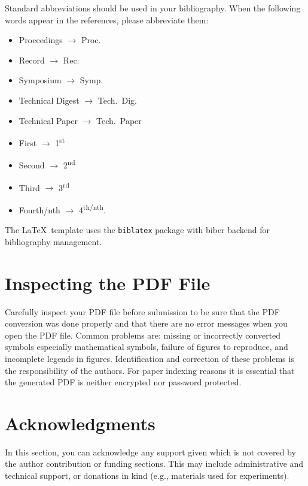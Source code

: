 \documentclass[non-peer-review]{fa2026}
\begin{document}
Standard abbreviations should be used in your bibliography. When the following words appear in the references, please abbreviate them: 
\begin{itemize}\setlength\itemsep{-0.25em}
\item Proceedings $\rightarrow$ Proc.\
\item Record $\rightarrow$ Rec.\
\item Symposium $\rightarrow$ Symp.\
\item Technical Digest $\rightarrow$ Tech.\ Dig.
\item Technical Paper $\rightarrow$ Tech.\ Paper
\item First $\rightarrow$ 1\textsuperscript{st}
\item Second $\rightarrow$ 2\textsuperscript{nd}
\item Third $\rightarrow$ 3\textsuperscript{rd}
\item Fourth/nth $\rightarrow$ 4\textsuperscript{th/nth}.
\end{itemize}

The \LaTeX\ template uses the \texttt{biblatex} package with biber backend for bibliography management.


\section{Inspecting the PDF File}
Carefully inspect your PDF file before submission to be sure that the PDF conversion was done properly and that there are no error messages when you open the PDF file. Common problems are: missing or incorrectly converted symbols especially mathematical symbols, failure of figures to reproduce, and incomplete legends in figures. Identification and correction of these problems is the responsibility of the authors. For paper indexing reasons it is essential that the generated PDF is neither encrypted nor password protected.

\section{Acknowledgments}
In this section, you can acknowledge any support given which is not covered by the author contribution or funding sections. This may include administrative and technical support, or donations in kind (e.g., materials used for experiments).


\printbibliography
\end{document}

